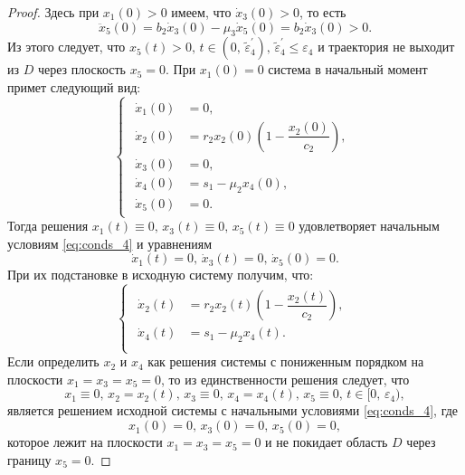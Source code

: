 \documentclass[14pt,a4paper]{extarticle}
\begin{document}
\begin{proof}
		Здесь при $x_1(0)>0$ имеем, что $\dot{x}_3(0)>0$, то есть
		\[\ddot{x}_5(0)=b_2\dot{x}_3(0)-\mu_3\dot{x}_5(0)=b_2\dot{x}_3(0)>0.\] 
		Из этого следует, что $x_5(t)>0,\, t\in(0,\, \tilde{\varepsilon}^\prime_4),\,\tilde{\varepsilon}^\prime_4\le\varepsilon_4$ и траектория не выходит из $D$ через плоскость $x_5=0$. При $x_1(0)=0$ система в начальный момент примет следующий вид:
		\begin{equation*}
			\begin{cases}
				\begin{aligned}
					\dot{x}_1(0) &= 0,\\
					\dot{x}_2(0) &= r_2x_2(0)\left(1-\dfrac{x_2(0)}{c_2}\right),\\
					\dot{x}_3(0) &= 0,\\ 
					\dot{x}_4(0) &= s_1-\mu_2x_4(0),\\
					\dot{x}_5(0) &= 0.
				\end{aligned}
			\end{cases}
		\end{equation*}
		Тогда решения $x_1(t)\equiv0,\, x_3(t)\equiv0,\, x_5(t)\equiv0$ удовлетворяет начальным условиям \ref{eq:conds_4} и уравнениям 
		\[\dot{x}_1(t)=0,\, \dot{x}_3(t)=0,\, \dot{x}_5(0)=0.\] 
		При их подстановке в исходную систему получим, что:
		\begin{equation*}
			\begin{cases}
				\begin{aligned}
					\dot{x}_2(t) &= r_2x_2(t)\left(1-\dfrac{x_2(t)}{c_2}\right),\\
					\dot{x}_4(t) &= s_1-\mu_2x_4(t).\\
				\end{aligned}
			\end{cases}
		\end{equation*}
		Если определить $x_2$ и $x_4$ как решения системы с пониженным порядком на плоскости $x_1=x_3=x_5=0$, то из единственности решения следует, что
		\[x_1\equiv0,\, x_2=x_2(t),\, x_3\equiv0,\, x_4=x_4(t),\, x_5\equiv0,\, t\in[0,\,\varepsilon_4),\]
		является решением исходной системы с начальными условиями \ref{eq:conds_4}, где
		\[x_1(0)=0,\, x_3(0)=0,\, x_5(0)=0,\]
		которое лежит на плоскости $x_1=x_3=x_5=0$ и не покидает область $D$ через границу $x_5=0$.
		

\end{proof}
\end{document}
